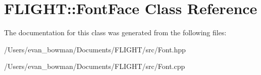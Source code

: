 \hypertarget{class_f_l_i_g_h_t_1_1_font_face}{}\section{F\+L\+I\+G\+HT\+:\+:Font\+Face Class Reference}
\label{class_f_l_i_g_h_t_1_1_font_face}


The documentation for this class was generated from the following files\+:\begin{DoxyCompactItemize}
\item 
/\+Users/evan\+\_\+bowman/\+Documents/\+F\+L\+I\+G\+H\+T/src/Font.\+hpp\item 
/\+Users/evan\+\_\+bowman/\+Documents/\+F\+L\+I\+G\+H\+T/src/Font.\+cpp\end{DoxyCompactItemize}
